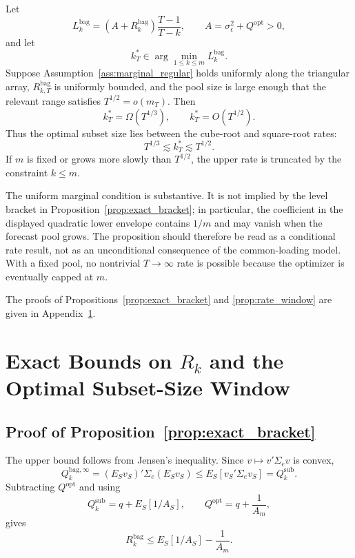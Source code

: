 \begin{proposition}
\label{prop:rate_window}
Let
\[
  L_k^{\mathrm{bag}}
  =
  \left(A+R_k^{\mathrm{bag}}\right)\frac{T-1}{T-k},
  \qquad
  A=\sigma_\epsilon^2+Q^{\mathrm{opt}}>0,
\]
and let
\[
  k_T^*\in\arg\min_{1\le k\le m}L_k^{\mathrm{bag}}.
\]
Suppose Assumption~\ref{ass:marginal_regular} holds uniformly along the
triangular array, $R_{k,T}^{\mathrm{bag}}$ is uniformly bounded, and the
pool size is large enough that the relevant range satisfies
$T^{1/2}=o(m_T)$.  Then
\[
  k_T^*=\Omega(T^{1/3}),
  \qquad
  k_T^*=O(T^{1/2}).
\]
Thus the optimal subset size lies between the cube-root and square-root
rates:
\[
  T^{1/3}\lesssim k_T^*\lesssim T^{1/2}.
\]
If $m$ is fixed or grows more slowly than $T^{1/2}$, the upper rate is
truncated by the constraint $k\le m$.
\end{proposition}

\noindent
The uniform marginal condition is substantive.  It is not implied by the
level bracket in Proposition~\ref{prop:exact_bracket}; in particular, the
coefficient in the displayed quadratic lower envelope contains $1/m$ and
may vanish when the forecast pool grows.  The proposition should therefore
be read as a conditional rate result, not as an unconditional consequence
of the common-loading model.  With a fixed pool, no nontrivial
$T\to\infty$ rate is possible because the optimizer is eventually capped
at $m$.

The proofs of Propositions~\ref{prop:exact_bracket} and
\ref{prop:rate_window} are given in Appendix~\ref{app:rk_bounds_rates}.


\section{Exact Bounds on $R_k$ and the Optimal Subset-Size Window}
\label{app:rk_bounds_rates}

\subsection{Proof of Proposition~\ref{prop:exact_bracket}}

The upper bound follows from Jensen's inequality.  Since
$v\mapsto v'\Sigma_e v$ is convex,
\[
  Q_k^{\mathrm{bag},\infty}
  =
  \left(E_S v_S\right)'\Sigma_e\left(E_S v_S\right)
  \le
  E_S[v_S'\Sigma_e v_S]
  =
  Q_k^{\mathrm{sub}}.
\]
Subtracting $Q^{\mathrm{opt}}$ and using
\[
  Q_k^{\mathrm{sub}}=q+E_S[1/A_S],
  \qquad
  Q^{\mathrm{opt}}=q+\frac{1}{A_m},
\]
gives
\[
  R_k^{\mathrm{bag}}
  \le
  E_S[1/A_S]-\frac{1}{A_m}.
\]

